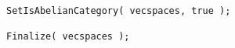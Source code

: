 \begin{small}
\begin{Verbatim}[frame=single]
SetIsAbelianCategory( vecspaces, true );

Finalize( vecspaces );
\end{Verbatim}
\end{small}